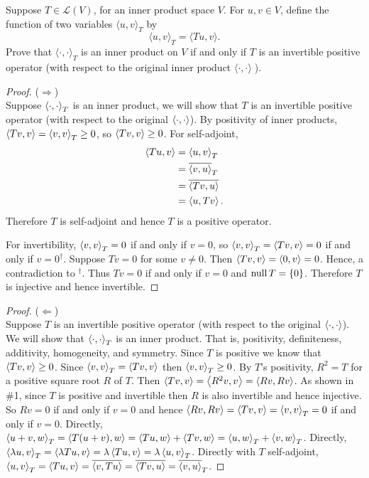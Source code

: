 Suppose $T \in \mathcal{L}(V)$, for an inner product space $V$. For $u , v \in V$, define the function of two variables $\langle u , v \rangle_T$ by
    \[
        \langle u , v \rangle_T = \langle Tu , v \rangle.
    \]
Prove that $\langle \cdot , \cdot \rangle_T$ is an inner product on $V$ if and only if $T$ is an invertible positive operator (with respect to the original inner product $\langle \cdot , \cdot \rangle \; $).

\begin{proof} ($\Longrightarrow$)\\
    Suppose $\inner{\cdot, \cdot}_T$ is an inner product, we will show that $T$ is an invertible positive operator (with respect to the original $\inner{\cdot, \cdot}$). By positivity of inner products, $\inner{Tv,v} = \inner{v,v}_T \geq 0$, so $\inner{Tv,v} \geq 0$. For self-adjoint, 
    \begin{align*}
        \inner{Tu,v} &= \inner{u,v}_T\\
        &= \innerconj{v,u}_T\\
        &= \innerconj{Tv,u}\\
        &= \inner{u,Tv}.
    \end{align*}
    Therefore $T$ is self-adjoint and hence $T$ is a positive operator.
    
    \nl For invertibility, $\inner{v,v}_T = 0$ if and only if $v=0$, so $\inner{v,v}_T = \inner{Tv,v} = 0$ if and only if $v = 0^\dagger  $. Suppose $Tv = 0$ for some $v \neq 0$. Then $\inner{Tv,v} = \inner{0,v} = 0$. Hence, a contradiction to $^\dagger $. Thus $Tv = 0$ if and only if $v = 0$ and $\operatorname{null} T = \{0\}$. Therefore $T$ is injective and hence invertible. 
\end{proof}

\begin{proof} ($\Longleftarrow$)\\
    Suppose $T$ is an invertible positive operator (with respect to the original $\inner{\cdot, \cdot}$). We will show that $\inner{\cdot, \cdot}_T$ is an inner product. That is, positivity, definiteness, additivity, homogeneity, and symmetry.
    Since $T$ is positive we know that $\inner{Tv, v} \geq 0$. Since $\inner{v,v}_T = \inner{Tv,v}$ then $\inner{v,v}_T \geq 0$.
    By $T$'s positivity, $R^2 = T$ for a positive square root $R$ of $T$. Then $\inner{Tv,v} = \inner{R^2v, v} = \inner{Rv, Rv}$. As shown in \#1, since $T$ is positive and invertible then $R$ is also invertible and hence injective. So $Rv = 0$ if and only if $v = 0$ and hence $\inner{Rv,Rv} = \inner{Tv, v} = \inner{v,v}_T = 0$ if and only if $v = 0$. 
    Directly, $\inner{u+v,w}_T = \inner{T(u+v), w} = \inner{Tu,w} + \inner{Tv,w} = \inner{u,w}_T + \inner{v,w}_T$.
    Directly, $\inner{\lambda u, v}_T = \inner{\lambda Tu,v} = \lambda \inner{Tu,v} = \lambda \inner{u,v}_T$.
    Directly with $T$ self-adjoint, $\inner{u,v}_T = \inner{Tu,v} = \innerconj{v,Tu} = \innerconj{Tv, u} = \innerconj{v,u}_T$.
\end{proof}